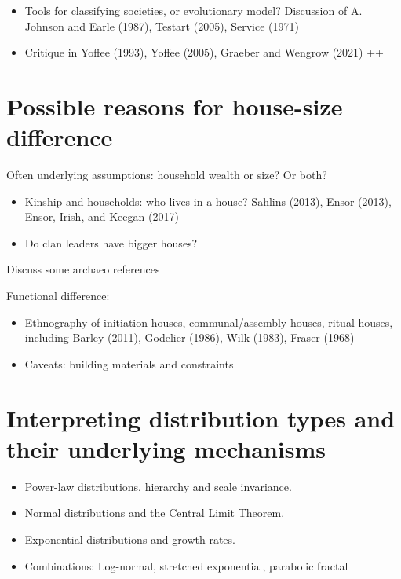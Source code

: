 \documentclass[
  12pt,
]{book}
\begin{document}
\begin{itemize}
\item
  Tools for classifying societies, or evolutionary model? Discussion of A. Johnson and Earle (1987), Testart (2005), Service (1971)
\item
  Critique in Yoffee (1993), Yoffee (2005), Graeber and Wengrow (2021) ++
\end{itemize}

\hypertarget{possible-reasons-for-house-size-difference}{%
\section{Possible reasons for house-size difference}\label{possible-reasons-for-house-size-difference}}

Often underlying assumptions: household wealth or size? Or both?

\begin{itemize}
\item
  Kinship and households: who lives in a house? Sahlins (2013), Ensor (2013), Ensor, Irish, and Keegan (2017)
\item
  Do clan leaders have bigger houses?
\end{itemize}

Discuss some archaeo references

Functional difference:

\begin{itemize}
\item
  Ethnography of initiation houses, communal/assembly houses, ritual houses, including Barley (2011), Godelier (1986), Wilk (1983), Fraser (1968)
\item
  Caveats: building materials and constraints
\end{itemize}

\hypertarget{interpreting-distribution-types-and-their-underlying-mechanisms}{%
\section{Interpreting distribution types and their underlying mechanisms}\label{interpreting-distribution-types-and-their-underlying-mechanisms}}

\begin{itemize}
\item
  Power-law distributions, hierarchy and scale invariance.
\item
  Normal distributions and the Central Limit Theorem.
\item
  Exponential distributions and growth rates.
\item
  Combinations: Log-normal, stretched exponential, parabolic fractal
\end{itemize}
\end{document}
